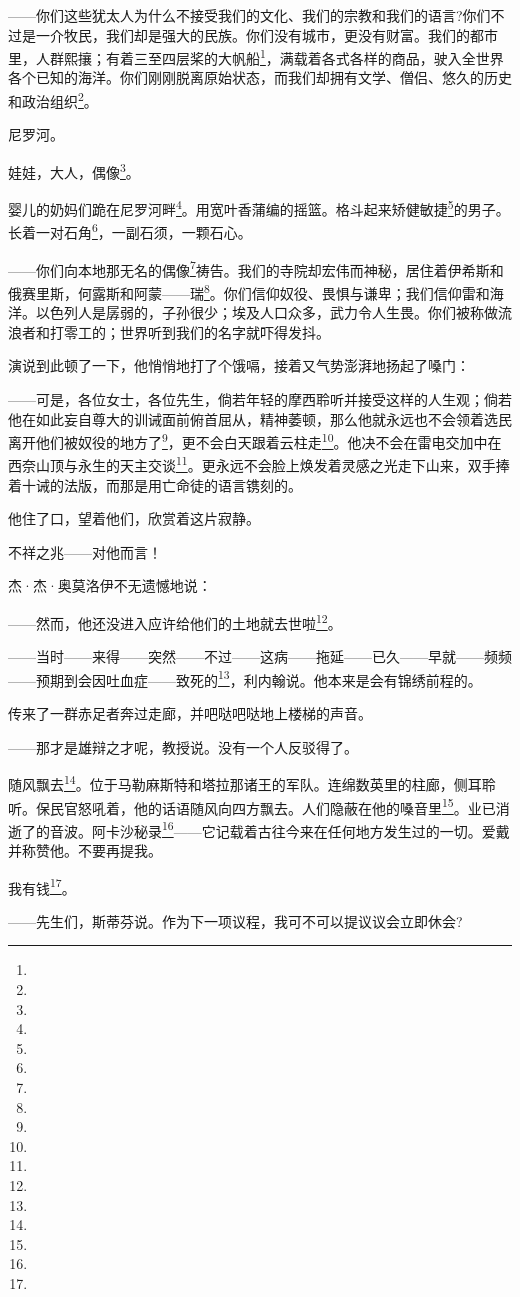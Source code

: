 \par ——你们这些犹太人为什么不接受我们的文化、我们的宗教和我们的语言?你们不过是一介牧民，我们却是强大的民族。你们没有城市，更没有财富。我们的都市里，人群熙攘；有着三至四层桨的大帆船\footnote{}，满载着各式各样的商品，驶入全世界各个已知的海洋。你们刚刚脱离原始状态，而我们却拥有文学、僧侣、悠久的历史和政治组织\footnote{}。
\par 尼罗河。
\par 娃娃，大人，偶像\footnote{}。
\par 婴儿的奶妈们跪在尼罗河畔\footnote{}。用宽叶香蒲编的摇篮。格斗起来矫健敏捷\footnote{}的男子。长着一对石角\footnote{}，一副石须，一颗石心。
\par ——你们向本地那无名的偶像\footnote{}祷告。我们的寺院却宏伟而神秘，居住着伊希斯和俄赛里斯，何露斯和阿蒙——瑞\footnote{}。你们信仰奴役、畏惧与谦卑；我们信仰雷和海洋。以色列人是孱弱的，子孙很少；埃及人口众多，武力令人生畏。你们被称做流浪者和打零工的；世界听到我们的名字就吓得发抖。
\par 演说到此顿了一下，他悄悄地打了个饿嗝，接着又气势澎湃地扬起了嗓门：
\par ——可是，各位女士，各位先生，倘若年轻的摩西聆听并接受这样的人生观；倘若他在如此妄自尊大的训诫面前俯首屈从，精神萎顿，那么他就永远也不会领着选民离开他们被奴役的地方了\footnote{}，更不会白天跟着云柱走\footnote{}。他决不会在雷电交加中在西奈山顶与永生的天主交谈\footnote{}。更永远不会脸上焕发着灵感之光走下山来，双手捧着十诫的法版，而那是用亡命徒的语言镌刻的。
\par 他住了口，望着他们，欣赏着这片寂静。
\par 不祥之兆——对他而言！
\par 杰·杰·奥莫洛伊不无遗憾地说：
\par ——然而，他还没进入应许给他们的土地就去世啦\footnote{}。
\par ——当时——来得——突然——不过——这病——拖延——已久——早就——频频——预期到会因吐血症——致死的\footnote{}，利内翰说。他本来是会有锦绣前程的。
\par 传来了一群赤足者奔过走廊，并吧哒吧哒地上楼梯的声音。
\par ——那才是雄辩之才呢，教授说。没有一个人反驳得了。
\par 随风飘去\footnote{}。位于马勒麻斯特和塔拉那诸王的军队。连绵数英里的柱廊，侧耳聆听。保民官怒吼着，他的话语随风向四方飘去。人们隐蔽在他的嗓音里\footnote{}。业已消逝了的音波。阿卡沙秘录\footnote{}——它记载着古往今来在任何地方发生过的一切。爱戴并称赞他。不要再提我。
\par 我有钱\footnote{}。
\par ——先生们，斯蒂芬说。作为下一项议程，我可不可以提议议会立即休会?
